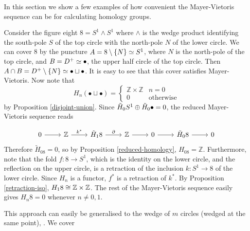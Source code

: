 In this section we show a few examples of how convenient the Mayer-Vietoris sequence can be for calculating homology groups.

\begin{example}
Consider the figure eight $8=S^1\wedge S^1$ where $\wedge$ is the wedge product identifying the south-pole $S$ of the top circle with the north-pole $N$ of the lower circle. We can cover $8$ by the puncture $A=8\setminus \{N\}\simeq S^1$, where $N$ is the north-pole of the top circle, and $B=D^+\simeq \bullet$, the upper half circle of the top circle. Then $A\cap B= D^+\setminus\{N\}\simeq \bullet \sqcup \bullet$. It is easy to see that this cover satisfies Mayer-Vietoris. Now note that $$H_n(\bullet \sqcup \bullet)=\begin{cases}\mathbb{Z}\times\mathbb{Z} & n=0\\ 0 & \text{otherwise}\end{cases}$$ by Proposition \ref{disjoint-union}. Since $\tilde{H}_0S^1\oplus \tilde{H}_0\bullet=0$, the reduced Mayer-Vietoris sequence reads 

\[\begin{tikzcd}
0 \arrow[r] & \mathbb{Z} \arrow[r, "k^*"] & \tilde{H}_18 \arrow[r, "\partial"] & \mathbb{Z} \arrow[r] & 0 \arrow[r] & \tilde{H}_08 \arrow[r] & 0
\end{tikzcd}\]
Therefore $\tilde{H}_08=0$, so by Proposition \ref{reduced-homology}, $H_08=\mathbb{Z}$. Furthermore, note that the fold $f:8\rightarrow S^1$, which is the identity on the lower circle, and the reflection on the upper circle, is a retraction of the inclusion $k:S^1\rightarrow 8$ of the lower circle. Since $H_n$ is a functor, $f^*$ is a retraction of $k^*$. By Proposition \ref{retraction-iso}, $H_18\cong \mathbb{Z}\times\mathbb{Z}$. The rest of the Mayer-Vietoris sequence easily gives $H_n8=0$ whenever $n\neq 0,1$.

This approach can easily be generalised to the wedge of $m$ circles (wedged at the same point), . We cover 



\end{example}
